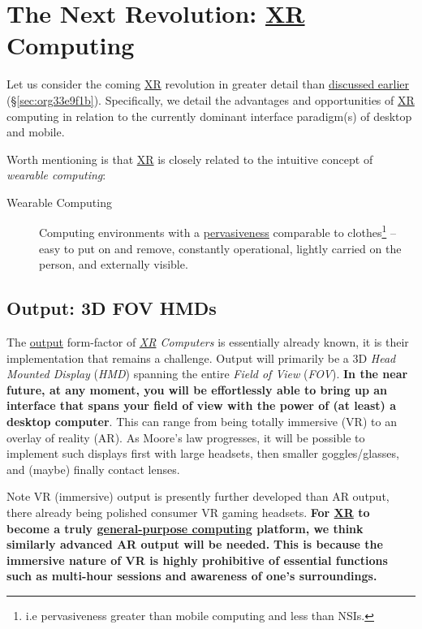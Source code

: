 \documentclass[logo,bsc,singlespacing,parskip]{infthesis}
\begin{document}
\chapter{The Next Revolution: \hyperref[org39cbd51]{XR} Computing}
\label{sec:orgb165994}
Let us consider the coming \hyperref[org39cbd51]{XR} revolution in greater detail than \hyperref[sec:org33e9f1b]{discussed earlier} (\S \ref{sec:org33e9f1b}).
Specifically, we detail the advantages and opportunities of \hyperref[org39cbd51]{XR} computing in relation to the currently dominant interface paradigm(s) of desktop and mobile.

Worth mentioning is that \hyperref[org39cbd51]{XR} is closely related to the intuitive concept of \emph{wearable computing}:

\begin{mdframed}
\begin{description}
\item[{Wearable Computing\label{wearable computing}}] Computing environments with a \hyperref[pervasiveness]{pervasiveness} comparable to clothes\footnote{i.e pervasiveness greater than mobile computing and less than NSIs.} -- easy to put on and remove, constantly operational, lightly carried on the person, and externally visible.
\end{description}
\end{mdframed}
\section{Output: 3D FOV HMDs}
\label{sec:orgb88004b}
The \hyperref[output]{output} form-factor of \emph{\hyperref[org39cbd51]{XR} Computers} is essentially already known, it is their implementation that remains a challenge.
Output will primarily be a 3D \emph{Head Mounted Display} (\emph{HMD}) spanning the entire \emph{Field of View} (\emph{FOV}).
\textbf{In the near future, at any moment, you will be effortlessly able to bring up an interface that spans your field of view with the power of (at least) a desktop computer}.
This can range from being totally immersive (VR) to an overlay of reality (AR).
As Moore's law progresses, it will be possible to implement such displays first with large headsets, then smaller goggles/glasses, and (maybe) finally contact lenses.

Note VR (immersive) output is presently further developed than AR output, there already being polished consumer VR gaming headsets.
\textbf{For \hyperref[org39cbd51]{XR} to become a truly \hyperref[orgbaec896]{general-purpose computing} platform, we think similarly advanced AR output will be needed.}
\textbf{This is because the immersive nature of VR is highly prohibitive of essential functions such as multi-hour sessions and awareness of one's surroundings.}
\end{document}
